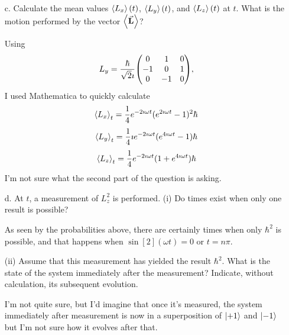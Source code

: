 \documentclass[a4paper,twoside]{article}
\begin{document}
\begin{itemize}
\begin{problem}
\begin{equation}
            \end{equation}
        \end{problem}
    \item[c.] Calculate the mean values $ \ev{L_x}(t) $, $ \ev{L_y}(t) $, and $ \ev{L_z}(t) $ at $ t $. What is the motion performed by the vector $ \ev{ \va{L}} $?
        \begin{problem}
            Using
            \begin{equation}
                L_y = \frac{\hbar}{\sqrt{2} \imath} \mqty(0 & 1 & 0 \\ -1 & 0 & 1 \\ 0 & -1 & 0),
            \end{equation}
            I used Mathematica to quickly calculate
            \begin{equation}
                \ev{L_x}_t = \frac{1}{4} e^{-2 \imath \omega t} (e^{2 \imath \omega t} - 1)^2 \hbar
            \end{equation}
            \begin{equation}
                \ev{L_y}_t = \frac{1}{4} \imath e^{- 2 \imath \omega t} (e^{4 \imath \omega t} - 1) \hbar
            \end{equation}
            \begin{equation}
                \ev{L_z}_t = \frac{1}{4} e^{-2 \imath \omega t} (1 + e^{4 \imath \omega t}) \hbar
            \end{equation}
            I'm not sure what the second part of the question is asking.
        \end{problem}
    \item[d.] At $ t $, a measurement of $ L_z^2 $ is performed.
        \subitem(i) Do times exist when only one result is possible?
        \begin{problem}
            As seen by the probabilities above, there are certainly times when only $ \hbar^2 $ is possible, and that happens when $ \sin[2](\omega t) = 0 $ or $ t = n \pi $.
        \end{problem}
        \subitem(ii) Assume that this measurement has yielded the result $ \hbar^2 $. What is the state of the system immediately after the measurement? Indicate, without calculation, its subsequent evolution.
        \begin{problem}
            I'm not quite sure, but I'd imagine that once it's measured, the system immediately after measurement is now in a superposition of $\ket{+1} $ and $\ket{-1} $ but I'm not sure how it evolves after that.
        \end{problem}
\end{itemize}
\end{document}

